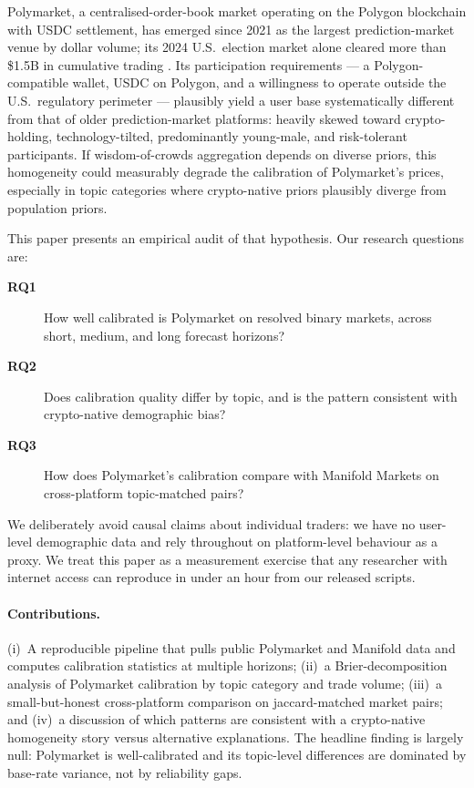\documentclass{article}
\begin{document}
Polymarket, a centralised-order-book market operating on the Polygon
blockchain with USDC settlement, has emerged since 2021 as the largest
prediction-market venue by dollar volume; its 2024 U.S.\ election market
alone cleared more than \$1.5B in cumulative trading
\citep{tsang2026anatomy,tsang2026shocks,cutting2025betting}. Its
participation requirements --- a Polygon-compatible wallet, USDC on
Polygon, and a willingness to operate outside the U.S.\ regulatory
perimeter --- plausibly yield a user base systematically different from
that of older prediction-market platforms: heavily skewed toward
crypto-holding, technology-tilted, predominantly young-male, and
risk-tolerant participants. If wisdom-of-crowds aggregation depends on
diverse priors, this homogeneity could measurably degrade the
calibration of Polymarket's prices, especially in topic categories where
crypto-native priors plausibly diverge from population priors.

This paper presents an empirical audit of that hypothesis. Our research
questions are:
\begin{description}
  \item[\textbf{RQ1}] How well calibrated is Polymarket on resolved
    binary markets, across short, medium, and long forecast horizons?
  \item[\textbf{RQ2}] Does calibration quality differ by topic, and is
    the pattern consistent with crypto-native demographic bias?
  \item[\textbf{RQ3}] How does Polymarket's calibration compare with
    Manifold Markets on cross-platform topic-matched pairs?
\end{description}
We deliberately avoid causal claims about individual traders: we have no
user-level demographic data and rely throughout on platform-level
behaviour as a proxy. We treat this paper as a measurement exercise that
any researcher with internet access can reproduce in under an hour from
our released scripts.

\paragraph{Contributions.} (i)~A reproducible pipeline that pulls public
Polymarket and Manifold data and computes calibration statistics at
multiple horizons; (ii)~a Brier-decomposition analysis of Polymarket
calibration by topic category and trade volume; (iii)~a
small-but-honest cross-platform comparison on jaccard-matched market
pairs; and (iv)~a discussion of which patterns are consistent with a
crypto-native homogeneity story versus alternative explanations.
The headline finding is largely null: Polymarket is well-calibrated and
its topic-level differences are dominated by base-rate variance, not by
reliability gaps.
\end{document}
